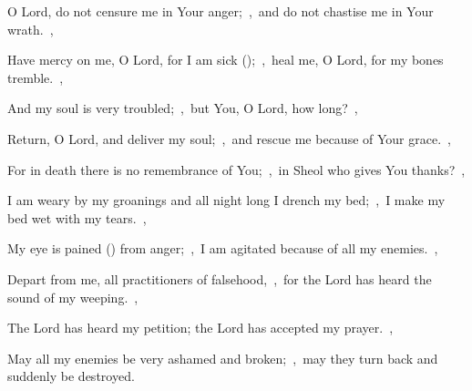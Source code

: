 \documentclass[12pt,twoside,a5paper]{article}
\begin{document}

\begin{normalparskip}
  O Lord, do not censure me in Your anger;~\sep\ and do not chastise me in Your wrath.~\sep


  Have mercy on me, O Lord, for I am sick ();~\sep\ heal me, O Lord, for my bones tremble.~\sep

  And my soul is very troubled;~\sep\ but You, O Lord, how long?~\sep

  Return, O Lord, and deliver my soul;~\sep\ and rescue me because of Your grace.~\sep

  For in death there is no remembrance of You;~\sep\ in Sheol who gives You thanks?~\sep

  I am weary by my groanings and all night long I drench my bed;~\sep\ I make my bed wet with my tears.~\sep

  My eye is pained () from anger;~\sep\ I am agitated because of all my enemies.~\sep

  Depart from me, all practitioners of falsehood,~\sep\ for the Lord has heard the sound of my weeping.~\sep

  The Lord has heard my petition; the Lord has accepted my prayer.~\sep

  May all my enemies be very ashamed and broken;~\sep\ may they turn back and suddenly be destroyed.
\end{normalparskip}

\end{document}

